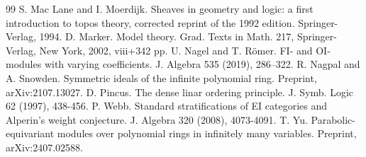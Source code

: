 \documentclass[11pt, reqno]{amsart}
\theoremstyle{plain}
\numberwithin{equation}{section}
\theoremstyle{definition}
\begin{document}
\begin{thebibliography}{99}
 S. Mac Lane and I. Moerdijk. Sheaves in geometry and logic: a first introduction to topos theory, corrected reprint of the 1992 edition. Springer-Verlag, 1994.
 D. Marker. Model theory. Grad. Texts in Math. 217, Springer-Verlag, New York, 2002, viii+342 pp.
 U. Nagel and T. R\"{o}mer. FI- and OI-modules with varying coefficients. J. Algebra 535 (2019), 286–322.
 R. Nagpal and A. Snowden. Symmetric ideals of the infinite polynomial ring. Preprint, arXiv:2107.13027.
 D. Pincus. The dense linar ordering principle. J. Symb. Logic 62 (1997), 438-456.
 P. Webb. Standard stratifications of EI categories and Alperin's weight conjecture. J. Algebra 320 (2008), 4073-4091.
 T. Yu. Parabolic-equivariant modules over polynomial rings in infinitely many variables. Preprint, arXiv:2407.02588.
\end{thebibliography}
\end{document}
